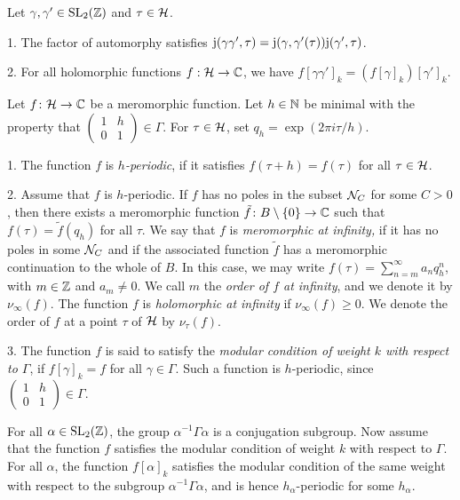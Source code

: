 \begin{remark}
 Let $\gamma,\gamma'\in\operatorname{SL}_2(\mathbb{Z})$ and $\tau\in\mathcal{H}$.
 
 1. The factor of automorphy satisfies $\mathrm{j}(\gamma\gamma',\tau) = \mathrm{j}(\gamma,\gamma'(\tau))\mathrm{j}(\gamma',\tau)$.
 
 2. For all holomorphic functions $f:\mathcal{H}\to\mathbb{C}$, we have $f[\gamma\gamma']_k=(f[\gamma]_k)[\gamma']_k$.
\end{remark}

\begin{defi} \label{df:autom-form}
 Let $f\colon \mathcal{H} \to \mathbb{C}$ be a meromorphic function. Let $h\in\mathbb{N}$ be minimal with the property that $\left(\begin{smallmatrix}1 & h\\0 & 1\end{smallmatrix}\right)\in\Gamma$. For $\tau\in\mathcal{H}$, set $q_h=\exp(2\pi i\tau/h)$.
 
  1. The function $f$ is \emph{$h$-periodic}, if it satisfies $f(\tau+h)=f(\tau)$ for all $\tau\in\mathcal{H}$.

  2. Assume that $f$ is $h$-periodic. If $f$ has no poles in the subset $\mathcal{N}_C$ for some $C>0$, then there exists a meromorphic function $\tilde f\colon B\setminus \{0\} \to \mathbb{C}$ such that $f(\tau)=\tilde f(q_h)$ for all $\tau$. We say that $f$ is \emph{meromorphic at infinity,} if it has no poles in some $\mathcal{N}_C$ and if the associated function $\tilde f$ has a meromorphic continuation to the whole of $B$. In this case, we may write $f(\tau)=\sum_{n=m}^\infty a_n q_h^n$, with $m\in\mathbb{Z}$ and $a_m\neq 0$. We call $m$ the \emph{order of $f$ at infinity}, and we denote it by $\nu_\infty(f)$. The function $f$ is \emph{holomorphic at infinity} if $\nu_\infty(f)\geq 0$. We denote the order of $f$ at a point $\tau$ of $\mathcal{H}$ by $\nu_\tau(f)$.
  
  3. The function $f$ is said to satisfy the \emph{modular condition of weight $k$ with respect to $\Gamma$}, if $f[\gamma]_k=f$ for all $\gamma \in \Gamma$. Such a function is $h$-periodic, since $\left(\begin{smallmatrix}1 & h\\0 & 1\end{smallmatrix}\right)\in\Gamma$.
  
  For all $\alpha\in\operatorname{SL}_2(\mathbb{Z})$, the group $\alpha^{-1}\Gamma\alpha$ is a conjugation subgroup. Now assume that the function $f$ satisfies the modular condition of weight $k$ with respect to $\Gamma$. For all $\alpha$, the function $f[\alpha]_k$ satisfies the modular condition of the same weight with respect to the subgroup $\alpha^{-1}\Gamma\alpha$, and is hence $h_\alpha$-periodic for some $h_\alpha$.
  

\end{defi}
